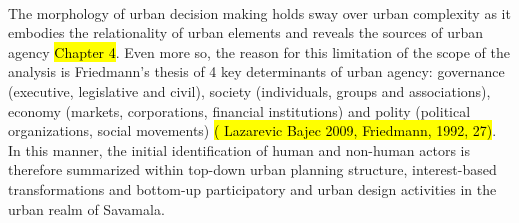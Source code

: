 \documentclass[11pt]{report}
\begin{document}
\\
The morphology of urban decision making holds sway over urban complexity as it embodies the relationality of urban elements and reveals the sources of urban agency \hl{Chapter 4}.
Even more so, the reason for this limitation of the scope of the analysis is Friedmann's thesis of 4 key determinants of urban agency: governance (executive, legislative and civil), society (individuals, groups and associations), economy (markets, corporations, financial institutions) and polity (political organizations, social movements) \hl{( Lazarevic Bajec 2009, Friedmann, 1992, 27)}. In this manner, the initial identification of human and non-human actors is therefore summarized within top-down urban planning structure, interest-based transformations and bottom-up participatory and urban design activities in the urban realm of Savamala.
\end{document}
